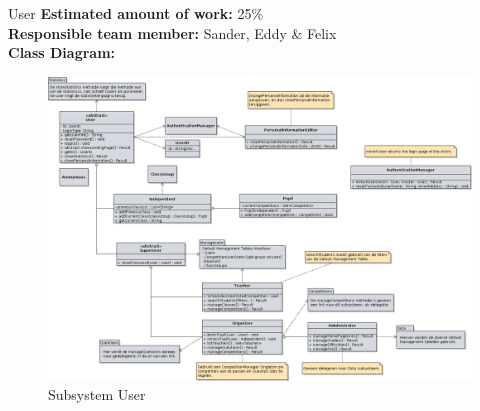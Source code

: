\begin{subsection}{User}
	\textbf{Estimated amount of work:} 25\% \\
    \textbf{Responsible team member:} Sander, Eddy \& Felix \\
	\textbf{Class Diagram:} \\
	
	\begin{figure}[!h]
	  \centering
		\includegraphics[width=1\textwidth]{../class_diagrams/user.png}
	  \caption{Subsystem User}
	  \label{subsystem_question}
	\end{figure}
	
\end{subsection}
